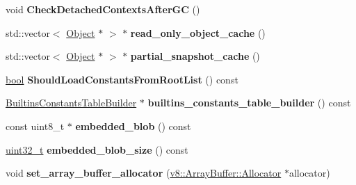 \begin{DoxyCompactItemize}
\item 
\mbox{\label{classv8_1_1internal_1_1Isolate_aabb6e95b866925ad45f3c80373bde61b}} 
void {\bfseries Check\+Detached\+Contexts\+After\+GC} ()
\item 
\mbox{\label{classv8_1_1internal_1_1Isolate_aa41f5bdc080ccb8a210e4e6b990fc5af}} 
std\+::vector$<$ \mbox{\hyperlink{classv8_1_1internal_1_1Object}{Object}} $\ast$ $>$ $\ast$ {\bfseries read\+\_\+only\+\_\+object\+\_\+cache} ()
\item 
\mbox{\label{classv8_1_1internal_1_1Isolate_a9e43765b44efc10197c7da4bbb0c7573}} 
std\+::vector$<$ \mbox{\hyperlink{classv8_1_1internal_1_1Object}{Object}} $\ast$ $>$ $\ast$ {\bfseries partial\+\_\+snapshot\+\_\+cache} ()
\item 
\mbox{\label{classv8_1_1internal_1_1Isolate_ab9e93562ecefec48b0c04c21af032ccd}} 
\mbox{\hyperlink{classbool}{bool}} {\bfseries Should\+Load\+Constants\+From\+Root\+List} () const
\item 
\mbox{\label{classv8_1_1internal_1_1Isolate_a219fe0f8eaab7928611afedaa0a6960c}} 
\mbox{\hyperlink{classv8_1_1internal_1_1BuiltinsConstantsTableBuilder}{Builtins\+Constants\+Table\+Builder}} $\ast$ {\bfseries builtins\+\_\+constants\+\_\+table\+\_\+builder} () const
\item 
\mbox{\label{classv8_1_1internal_1_1Isolate_a9d0df6327f9ca8b7feeeb7a8d949a50e}} 
const uint8\+\_\+t $\ast$ {\bfseries embedded\+\_\+blob} () const
\item 
\mbox{\label{classv8_1_1internal_1_1Isolate_aa42d8e2d3d4b0d7052bcf7d3ed6fa6e1}} 
\mbox{\hyperlink{classuint32__t}{uint32\+\_\+t}} {\bfseries embedded\+\_\+blob\+\_\+size} () const
\item 
\mbox{\label{classv8_1_1internal_1_1Isolate_aea4c8c96eaaf8d0bf8e3f08ceaf07f34}} 
void {\bfseries set\+\_\+array\+\_\+buffer\+\_\+allocator} (\mbox{\hyperlink{classv8_1_1ArrayBuffer_1_1Allocator}{v8\+::\+Array\+Buffer\+::\+Allocator}} $\ast$allocator)

\end{DoxyCompactItemize}
